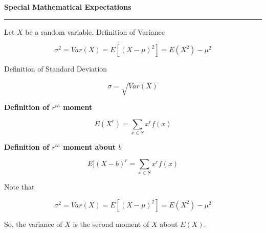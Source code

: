 \nopagenumbers
{\bf Special Mathematical Expectations}
\vskip 1mm
\hrule

\vskip 6pt
Let $X$ be a random variable.
\vskip 6pt
{Definition of Variance}

$$\sigma^2=Var(X)=E[(X-\mu)^2]=E(X^2)-\mu^2$$

\vskip 1cm
{Definition of Standard Deviation}

$$\sigma=\sqrt{Var(X)}$$

\vskip 1cm
{\bf Definition of $r^{th}$ moment}

$$E(X^r)=\sum_{x\in S}x^rf(x)$$

\vskip 1cm
{\bf Definition of $r^{th}$ moment about $b$}

$$E[(X-b)^r=\sum_{x\in S}x^rf(x)$$

Note that

$$\sigma^2=Var(X)=E[(X-\mu)^2]=E(X^2)-\mu^2$$

\vskip 1mm
So, the variance of $X$ is the second moment of $X$ about $E(X)$.






\filbreak


\vfill\eject
\bye
